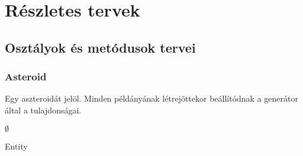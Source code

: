 \documentclass[../../projlab]{subfiles}
\begin{document}
\chapter{Részletes tervek}

\section{Osztályok és metódusok tervei}

\subsection{Asteroid}
\begin{class-template-responsibility}
Egy aszteroidát jelöl. Minden példányának létrejöttekor beállítódnak a generátor által a tulajdonságai.
\end{class-template-responsibility}
\begin{class-template-interface}
$\emptyset$
\end{class-template-interface}
\begin{class-template-baseclass}
Entity
\end{class-template-baseclass}
\end{document}
